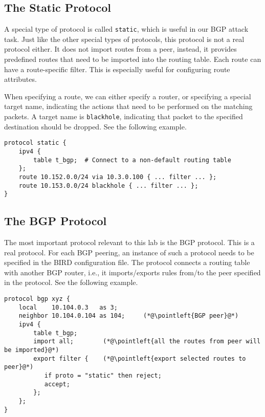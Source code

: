 \subsection{The Static Protocol} 

A special type of protocol is called \texttt{static}, which is 
useful in our BGP attack task. Just like the other special
types of protocols, this protocol is not a real protocol either.
It does not import routes from a peer, instead, it provides 
predefined routes that need to be imported into 
the routing table. Each route can have a route-specific
filter. This is especially useful for configuring route attributes. 

When specifying a route, we can either specify a router, or 
specifying a special target name, indicating the actions 
that need to be performed on the matching packets. 
A target name is \texttt{blackhole},
indicating that packet to the specified destination should be 
dropped. See the following example.

\begin{lstlisting}
protocol static {
    ipv4 {
        table t_bgp;  # Connect to a non-default routing table
    };
    route 10.152.0.0/24 via 10.3.0.100 { ... filter ... };
    route 10.153.0.0/24 blackhole { ... filter ... };
}
\end{lstlisting}



\subsection{The BGP Protocol} 

The most important protocol relevant to this lab is the BGP protocol.
This is a real protocol. For each BGP peering, an instance of 
such a protocol needs to be specified in the BIRD configuration 
file. The protocol connects a routing table with another 
BGP router, i.e., it imports/exports rules from/to 
the peer specified in the protocol.
See the following example. 

\begin{lstlisting}
protocol bgp xyz {
    local    10.104.0.3   as 3;
    neighbor 10.104.0.104 as 104;     (*@\pointleft{BGP peer}@*)
    ipv4 {
        table t_bgp;
        import all;        (*@\pointleft{all the routes from peer will be imported}@*)
        export filter {    (*@\pointleft{export selected routes to peer}@*)
           if proto = "static" then reject;
           accept;
        };
    };
}
\end{lstlisting}

